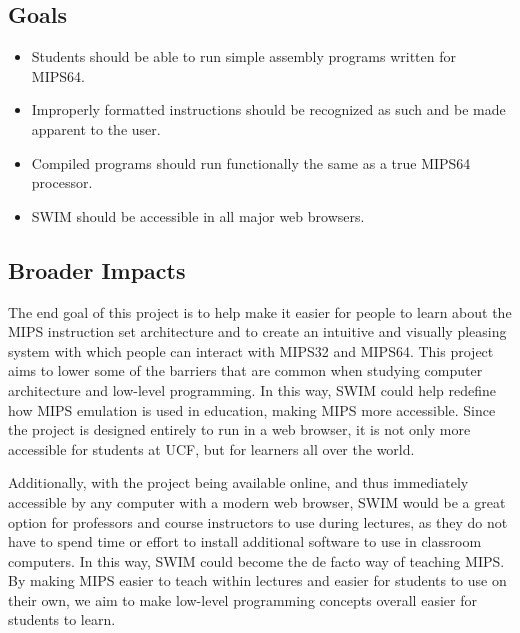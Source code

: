 \documentclass[
    paper=letter,
    parskip=half,
    fontsize=12pt,
    titlepage=firstiscover,
    toc=bibliography,
    numbers=endperiod
]{scrartcl}
\begin{document}
\subsection{Goals}

\begin{itemize}
    \item Students should be able to run simple assembly programs written for MIPS64.
    \item Improperly formatted instructions should be recognized as such and be made apparent to the user.
    \item Compiled programs should run functionally the same as a true MIPS64 processor.
    \item SWIM should be accessible in all major web browsers.
\end{itemize}


\subsection{Broader Impacts}
The end goal of this project is to help make it easier for people to learn about the MIPS instruction set architecture and to create an intuitive and visually pleasing system with which people can interact with MIPS32 and MIPS64. This project aims to lower some of the barriers that are common when studying computer architecture and low-level programming. In this way, SWIM could help redefine how MIPS emulation is used in education, making MIPS more accessible. Since the project is designed entirely to run in a web browser, it is not only more accessible for students at UCF, but for learners all over the world.

Additionally, with the project being available online, and thus immediately accessible by any computer with a modern web browser, SWIM would be a great option for professors and course instructors to use during lectures, as they do not have to spend time or effort to install additional software to use in classroom computers. In this way, SWIM could become the de facto way of teaching MIPS. By making MIPS easier to teach within lectures and easier for students to use on their own, we aim to make low-level programming concepts overall easier for students to learn.
\end{document}

